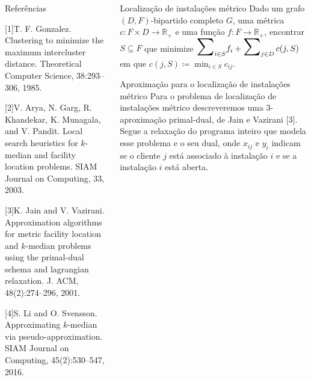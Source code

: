 \documentclass[final]{beamer}
\begin{document}
\begin{frame}[t]
\begin{columns}[t]
\begin{column}{0.47\paperwidth}
\begin{block}{Referências}
      
  [1]T. F. Gonzalez. Clustering to minimize the maximum intercluster distance.
  Theoretical Computer Science, 38:293–306, 1985.
  
  [2]V. Arya, N. Garg, R. Khandekar, K. Munagala, and V. Pandit. Local search heuristics for $k$-median and facility location problems. SIAM
  Journal on Computing, 33, 2003.
  
  [3]K. Jain and V. Vazirani. Approximation algorithms for metric facility location and $k$-median problems using the primal-dual schema and lagrangian
  relaxation. J. ACM, 48(2):274–296, 2001.

  [4]S. Li and O. Svensson. Approximating $k$-median via pseudo-approximation. SIAM Journal on Computing, 45(2):530–547, 2016.
\end{block}
\end{column}

  \begin{column}{0.48\paperwidth}
    \begin{alertblock}{Localização de instalações métrico}
      Dado um grafo $(D,F)$-bipartido completo $G$, uma métrica $c : F \times D \rightarrow \mathbb{R}_+$ e uma função $f : F \rightarrow \mathbb{R}_+$, encontrar $S\subseteq F$ que minimize $\scalebox{2}{$\sum$}_{i\in S} f_i + \scalebox{2}{$\sum$}_{j \in D} \, c(j,S)$ em que $c(j,S) \coloneqq \min_{i \in S} c_{ij}$.
      
    \end{alertblock}

    \begin{block}{Aproximação para o localização de instalações métrico}
      Para o problema de localização de instalações métrico descreveremos uma 3-aproximação primal-dual, de Jain e Vazirani [3]. Segue a relaxação do programa inteiro que modela esse problema e o seu dual, onde $x_{ij}$ e $y_i$ indicam se o cliente $j$ está associado à instalação $i$ e se a instalação $i$ está aberta.


\end{block}
\end{column}
\end{columns}
\end{frame}
\end{document}
